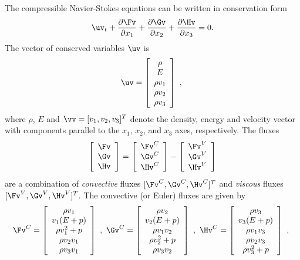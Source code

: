 \documentclass{article}
\begin{document}
The compressible Navier-Stokes equations can be written in
conservation form
$$
   \uv_t + {\partial \Fv\over \partial x_1}
         + {\partial \Gv\over \partial x_2}
         + {\partial \Hv\over \partial x_3}    =  0 .
$$
The vector of conserved variables $\uv$ is
$$
 \uv = \left[ \begin{array}{c}
    \rho \\ E \\ \rho v_1 \\ \rho v_2  \\  \rho v_3
              \end{array}\right]  ~,~
$$
where $\rho$, $E$ and $\vv=[v_1,v_2,v_3]^T$ denote the density, energy and
velocity vector with components parallel to the $x_1$, $x_2$, and $x_3$ axes, respectively.  The fluxes
$$
  \left[ \begin{array}{c}
    \Fv \\ \Gv \\ \Hv
              \end{array}\right]
 =\left[ \begin{array}{c}
    \Fv^C \\ \Gv^C \\ \Hv^C
              \end{array}\right]
 -\left[ \begin{array}{c}
    \Fv^V \\ \Gv^V \\ \Hv^V
              \end{array}\right]
$$
 are a combination of
{\it convective} fluxes $[\Fv^C,\Gv^C,\Hv^C]^T$ and {\it viscous}
fluxes $[\Fv^V,\Gv^V,\Hv^V]^T$.
The convective (or Euler) fluxes are given by
$$
 \Fv^C = \left[ \begin{array}{c}
 \rho v_1 \\ v_1(E+p) \\ \rho v_1^2 + p \\ \rho v_2 v_1 \\ \rho v_3 v_1
                \end{array}\right]  ~,~
 \Gv^C = \left[ \begin{array}{c}
 \rho v_2 \\ v_2(E+p) \\ \rho v_1 v_2 \\ \rho v_2^2+p \\ \rho v_3 v_2
                \end{array}\right]  ~,~
 \Hv^C = \left[ \begin{array}{c}
 \rho v_3 \\ v_3(E+p) \\ \rho v_1 v_3 \\ \rho v_2 v_3 \\ \rho v_3^2+p
                \end{array}\right]  ~,~
$$
\end{document}
